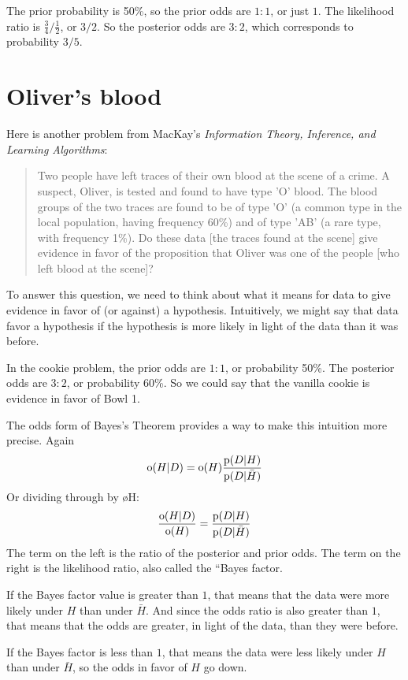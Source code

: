 \documentclass[12pt]{book}
\begin{document}
The prior probability is 50\%, so the prior odds are $1:1$, or just
$1$.  The likelihood ratio is $\frac{3}{4} / \frac{1}{2}$, or $3/2$.
So the posterior odds are $3:2$, which corresponds to probability
$3/5$.


\section{Oliver's blood}

Here is another problem from MacKay's {\it Information Theory,
  Inference, and Learning Algorithms}:

\begin{quote}
Two people have left traces of their own blood at the scene of
a crime.  A suspect, Oliver, is tested and found to have type
'O' blood.  The blood groups of the two traces are found to
be of type 'O' (a common type in the local population, having frequency
60\%) and of type 'AB' (a rare type, with frequency 1\%).
Do these data [the traces found at the scene] give evidence
in favor of the proposition that Oliver was one of the people
[who left blood at the scene]?
\end{quote}

To answer this question, we need to think about what it means
for data to give evidence in favor of (or against) a hypothesis.
Intuitively, we might say that data favor a hypothesis if the
hypothesis is more likely in light of the data than it was before.

In the cookie problem, the prior odds are $1:1$, or probability 50\%.
The posterior odds are $3:2$, or probability 60\%.  So we could say
that the vanilla cookie is evidence in favor of Bowl 1.

The odds form of Bayes's Theorem provides a way to make this
intuition more precise.  Again
%
\[ \mathrm{o}(H|D) = \mathrm{o}(H) \frac{\mathrm{p}(D|H)}{\mathrm{p}(D|\bar{H})} \]
%
Or dividing through by \o{H}:
%
\[ \frac{\mathrm{o}(H|D)}{\mathrm{o}(H)} = \frac{\mathrm{p}(D|H)}{\mathrm{p}(D|\bar{H})} \]
%
The term on the left is the ratio of the posterior and prior odds.
The term on the right is the likelihood ratio, also called the ``Bayes
factor.

If the Bayes factor value is greater than $1$, that means that the
data were more likely under $H$ than under $\bar{H}$.  And since the
odds ratio is also greater than $1$, that means that the odds are
greater, in light of the data, than they were before.

If the Bayes factor is less than $1$, that means the data were
less likely under $H$ than under $\bar{H}$, so the odds in
favor of $H$ go down.
\end{document}
